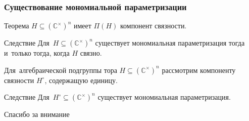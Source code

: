 \documentclass{beamer}
\begin{document}
\begin{frame}
  \frametitle{Существование мономиальной параметризации}

  \begin{block}{Теорема}
    $H \subseteq (\mathbb{C}^\times)^n$ имеет $\Pi(H)$ компонент связности.
  \end{block}

  \begin{block}{Следствие}
    Для~$H \subseteq (\mathbb{C}^\times)^n$ существует мономиальная параметризация
    тогда и~только тогда, когда $H$ связно.
  \end{block}

  Для~алгебраической подгруппы тора $H \subseteq (\mathbb{C}^\times)^n$ рассмотрим компоненту
  связности $H^\circ$, содержащую единицу.

  \begin{block}{Следствие}
    Для~$H^\circ \subseteq (\mathbb{C}^\times)^n$ существует мономиальная параметризация.
  \end{block}
\end{frame}

\begin{frame}
  \centering \Huge{Спасибо за внимание}
\end{frame}
\end{document}
